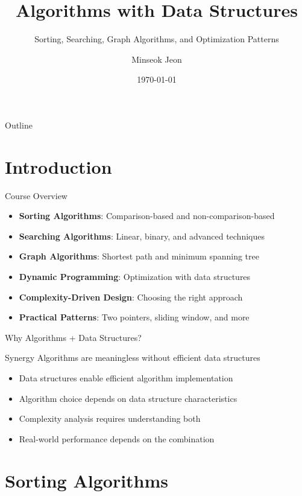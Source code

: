 \documentclass[aspectratio=169,xcolor=dvipsnames]{beamer}
\title{Algorithms with Data Structures}
\subtitle{Sorting, Searching, Graph Algorithms, and Optimization Patterns}
\author{Minseok Jeon}
\institute{DGIST}
\date{\today}
\begin{document}
\begin{frame}
  \titlepage
\end{frame}

\begin{frame}{Outline}
  \tableofcontents
\end{frame}

\section{Introduction}

\begin{frame}{Course Overview}
  \begin{itemize}
    \item \textbf{Sorting Algorithms}: Comparison-based and non-comparison-based
    \item \textbf{Searching Algorithms}: Linear, binary, and advanced techniques
    \item \textbf{Graph Algorithms}: Shortest path and minimum spanning tree
    \item \textbf{Dynamic Programming}: Optimization with data structures
    \item \textbf{Complexity-Driven Design}: Choosing the right approach
    \item \textbf{Practical Patterns}: Two pointers, sliding window, and more
  \end{itemize}
\end{frame}

\begin{frame}{Why Algorithms + Data Structures?}
  \begin{block}{Synergy}
    Algorithms are meaningless without efficient data structures
  \end{block}

  \begin{itemize}
    \item Data structures enable efficient algorithm implementation
    \item Algorithm choice depends on data structure characteristics
    \item Complexity analysis requires understanding both
    \item Real-world performance depends on the combination
  \end{itemize}
\end{frame}

\section{Sorting Algorithms}
\end{document}
